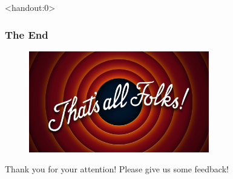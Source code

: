 \documentclass[english,xcolor=pdftex,dvipsnames,aspectratio=169]{beamer}
\begin{document}
 
\begin{frame}<handout:0> 
  \frametitle{The End}
 \begin{center}
   \begin{figure}
     \centering
     \includegraphics[width=0.7\textwidth]{the_end.jpg}
   \end{figure}
   Thank you for your attention! \newline Please give us some feedback!
 \end{center}
\end{frame}
\end{document}
